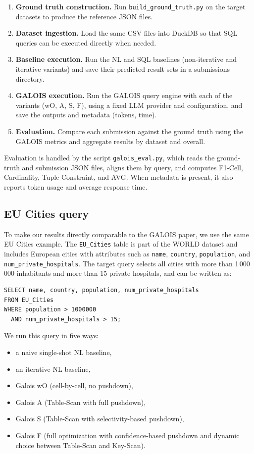 \documentclass[11pt]{article}
\begin{document}
\begin{enumerate}
  \item \textbf{Ground truth construction.} Run \texttt{build\_ground\_truth.py} on the
    target datasets to produce the reference JSON files.
  \item \textbf{Dataset ingestion.} Load the same CSV files into DuckDB so that SQL
    queries can be executed directly when needed.
  \item \textbf{Baseline execution.} Run the NL and SQL baselines (non-iterative and
    iterative variants) and save their predicted result sets in a submissions directory.
  \item \textbf{GALOIS execution.} Run the GALOIS query engine with each of the
    variants (wO, A, S, F), using a fixed LLM provider and configuration, and save
    the outputs and metadata (tokens, time).
  \item \textbf{Evaluation.} Compare each submission against the ground truth using
    the GALOIS metrics and aggregate results by dataset and overall.
\end{enumerate}

Evaluation is handled by the script \texttt{galois\_eval.py}, which reads the ground-truth
and submission JSON files, aligns them by query, and computes F1-Cell, Cardinality,
Tuple-Constraint, and AVG. When metadata is present, it also reports token usage and
average response time.

\subsection{EU Cities query}

To make our results directly comparable to the GALOIS paper, we use the same EU
Cities example. The \texttt{EU\_Cities} table is part of the WORLD dataset and includes
European cities with attributes such as \texttt{name}, \texttt{country}, \texttt{population},
and \texttt{num\_private\_hospitals}. The target query selects all cities with more than
1\,000\,000 inhabitants and more than 15 private hospitals, and can be written as:

\begin{verbatim}
SELECT name, country, population, num_private_hospitals
FROM EU_Cities
WHERE population > 1000000
  AND num_private_hospitals > 15;
\end{verbatim}

We run this query in five ways:

\begin{itemize}
  \item a naive single-shot NL baseline,
  \item an iterative NL baseline,
  \item Galois wO (cell-by-cell, no pushdown),
  \item Galois A (Table-Scan with full pushdown),
  \item Galois S (Table-Scan with selectivity-based pushdown),
  \item Galois F (full optimization with confidence-based pushdown and dynamic choice
        between Table-Scan and Key-Scan).
\end{itemize}
\end{document}
